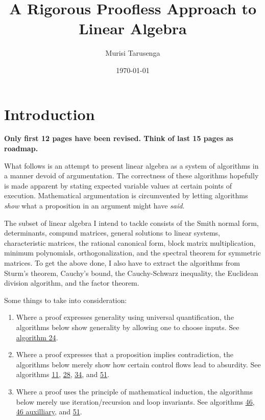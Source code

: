 \documentclass[twocolumn]{article}
\begin{document}
	\title{A Rigorous Proofless Approach to Linear Algebra}
	\author{Murisi Tarusenga}
	\date{\today{} \currenttime}
	\maketitle
	\section{Introduction}
		\textbf{Only first 12 pages have been revised. Think of last 15 pages as roadmap.}
		
		What follows is an attempt to present linear algebra as a system of algorithms in a manner devoid of argumentation. The correctness of these algorithms hopefully is made apparent by stating expected variable values at certain points of execution. Mathematical argumentation is circumvented by letting algorithms \textit{show} what a proposition in an argument might have \textit{said}.
		
		The subset of linear algebra I intend to tackle consists of the Smith normal form, determinants, compund matrices, general solutions to linear systems, characteristic matrices, the rational canonical form, block matrix multiplication, minimum polynomials, orthogonalization, and the spectral theorem for symmetric matrices. To get the above done, I also have to extract the algorithms from Sturm's theorem, Cauchy's bound, the Cauchy-Schwarz inequality, the Euclidean division algorithm, and the factor theorem.
		
		Some things to take into consideration:
		\begin{enumerate}
			\item Where a proof expresses generality using universal quantification, the algorithms below show generality by allowing one to choose inputs. See \hyperref[sec:algorithm 24]{algorithm 24}.
			\item Where a proof expresses that a proposition implies contradiction, the algorithms below merely show how certain control flows lead to absurdity. See algorithms \hyperref[sec:algorithm 11]{11}, \hyperref[sec:algorithm 28]{28}, \hyperref[sec:algorithm 34]{34}, and \hyperref[sec:algorithm 51]{51}.
			\item Where a proof uses the principle of mathematical induction, the algorithms below merely use iteration/recursion and loop invariants. See algorithms \hyperref[sec:algorithm 46]{46}, \hyperref[sec:algorithm 46]{46 auxilliary}, and \hyperref[sec:algorithm 51]{51}.
		\end{enumerate}
		
\end{document}
